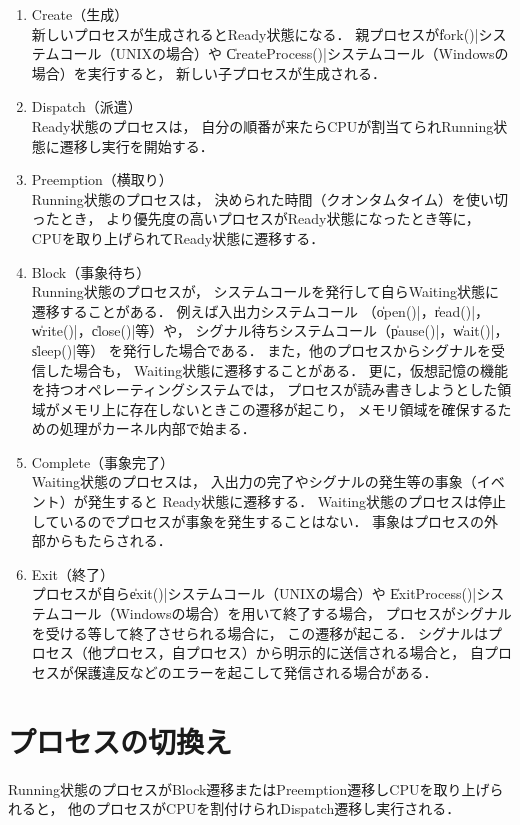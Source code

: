 \begin{enumerate}
\item Create（生成） \\
新しいプロセスが生成されるとReady状態になる．
親プロセスが\|fork()|システムコール（UNIXの場合）や
\|CreateProcess()|システムコール（Windowsの場合）を実行すると，
新しい子プロセスが生成される．

\item Dispatch（派遣） \\
Ready状態のプロセスは，
自分の順番が来たらCPUが割当てられRunning状態に遷移し実行を開始する．

\item Preemption（横取り） \\
Running状態のプロセスは，
決められた時間（クオンタムタイム）を使い切ったとき，
より優先度の高いプロセスがReady状態になったとき等に，
CPUを取り上げられてReady状態に遷移する．

\item Block（事象待ち） \\
Running状態のプロセスが，
システムコールを発行して自らWaiting状態に遷移することがある．
例えば入出力システムコール
（\|open()|，\|read()|，\|write()|，\|close()|等）や，
シグナル待ちシステムコール（\|pause()|，\|wait()|，\|sleep()|等）
を発行した場合である．
また，他のプロセスからシグナルを受信した場合も，
Waiting状態に遷移することがある．
更に，仮想記憶の機能を持つオペレーティングシステムでは，
プロセスが読み書きしようとした領域がメモリ上に存在しないときこの遷移が起こり，
メモリ領域を確保するための処理がカーネル内部で始まる．

\item Complete（事象完了） \\
Waiting状態のプロセスは，
入出力の完了やシグナルの発生等の事象（イベント）が発生すると
Ready状態に遷移する．
Waiting状態のプロセスは停止しているのでプロセスが事象を発生することはない．
事象はプロセスの外部からもたらされる．

\item Exit（終了） \\
プロセスが自ら\|exit()|システムコール（UNIXの場合）や
\|ExitProcess()|システムコール（Windowsの場合）を用いて終了する場合，
プロセスがシグナルを受ける等して終了させられる場合に，
この遷移が起こる．
シグナルはプロセス（他プロセス，自プロセス）から明示的に送信される場合と，
自プロセスが保護違反などのエラーを起こして発信される場合がある．
\end{enumerate}

\section{プロセスの切換え}
Running状態のプロセスがBlock遷移またはPreemption遷移しCPUを取り上げられると，
他のプロセスがCPUを割付けられDispatch遷移し実行される．

